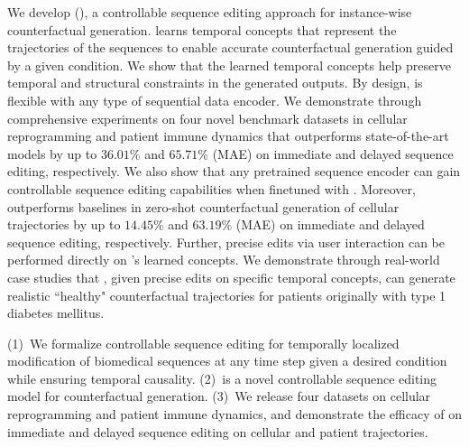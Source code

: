 We develop \name (\longname), a controllable sequence editing approach for instance-wise counterfactual generation. \name learns temporal concepts that represent the trajectories of the sequences to enable accurate counterfactual generation guided by a given condition. We show that the learned temporal concepts help preserve temporal and structural constraints in the generated outputs. By design, \name is flexible with any type of sequential data encoder. We demonstrate through comprehensive experiments on four novel benchmark datasets in cellular reprogramming and patient immune dynamics that \name outperforms state-of-the-art models by up to $36.01\%$ and $65.71\%$ (MAE) on immediate and delayed sequence editing, respectively. We also show that any pretrained sequence encoder can gain controllable sequence editing capabilities when finetuned with \name. Moreover, \name outperforms baselines in zero-shot counterfactual generation of cellular trajectories by up to $14.45\%$ and $63.19\%$ (MAE) on immediate and delayed sequence editing, respectively. Further, precise edits via user interaction can be performed directly on \name's learned concepts. We demonstrate through real-world case studies that \name, given precise edits on specific temporal concepts, can generate realistic ``healthy" counterfactual trajectories for patients originally with type 1 diabetes mellitus.



 (1)~We formalize controllable sequence editing for temporally localized modification of biomedical sequences at any time step given a desired condition while ensuring temporal causality. (2)~\name is a novel controllable sequence editing model for counterfactual generation. (3)~We release four datasets on cellular reprogramming and patient immune dynamics, and demonstrate the efficacy of \name on immediate and delayed sequence editing on cellular and patient trajectories.


